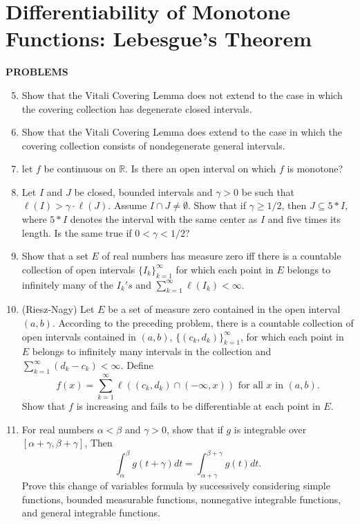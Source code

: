 \section{Differentiability of Monotone Functions: Lebesgue's Theorem}
\begin{center}
	\textbf{PROBLEMS}
\end{center}
\begin{enumerate}
	\setcounter{enumi}{4}
    \item Show that the Vitali Covering Lemma does not extend to the case in which the covering collection has degenerate closed intervals.
    \item Show that the Vitali Covering Lemma does extend to the case in which the covering collection consists of nondegenerate general intervals.
    \item let $f$ be continuous on $\mathbb{R}$. Is there an open interval on which $f$ is monotone?
    \item Let $I$ and $J$ be closed, bounded intervals and $\gamma>0$ be such that $\ell(I)>\gamma\cdot\ell(J)$.
    Assume $I\cap J\neq\emptyset$. Show that if $\gamma\ge 1/2$, then $J\subseteq 5*I$, where $5*I$ denotes the interval with the same center as $I$ and five times its length.
    Is the same true if $0<\gamma<1/2$?
    \item Show that a set $E$ of real numbers has measure zero iff there is a countable collection of open intervals $\{I_k\}_{k=1}^\infty$ for which each point in $E$ belongs to infinitely many of the $I_k's$ and $\sum_{k=1}^\infty\ell(I_k)<\infty$.
    \item (Riesz-Nagy) Let $E$ be a set of measure zero contained in the open interval $(a,b)$.
    According to the preceding problem, there is a countable collection of open intervals contained in $(a,b)$, $\{(c_k,d_k)\}_{k=1}^\infty$, for which each point in $E$ belongs to infinitely many intervals in the collection and $\sum_{k=1}^\infty(d_k-c_k)<\infty$.
    Define
    \[
        f(x)=\sum_{k=1}^\infty\ell((c_k,d_k)\cap(-\infty,x))\text{ for all }x\text{ in }(a,b).
    \]
    Show that $f$ is increasing and fails to be differentiable at each point in $E$.
    \item For real numbers $\alpha<\beta$ and $\gamma>0$, show that if $g$ is integrable over $[\alpha+\gamma,\beta+\gamma]$, Then
    \[
        \int_{\alpha}^{\beta}g(t+\gamma)dt=\int_{\alpha+\gamma}^{\beta+\gamma}g(t)dt.  
    \]
    Prove this change of variables formula by successively considering simple functions, bounded measurable functions, nonnegative integrable functions, and general integrable functions.

\end{enumerate}
